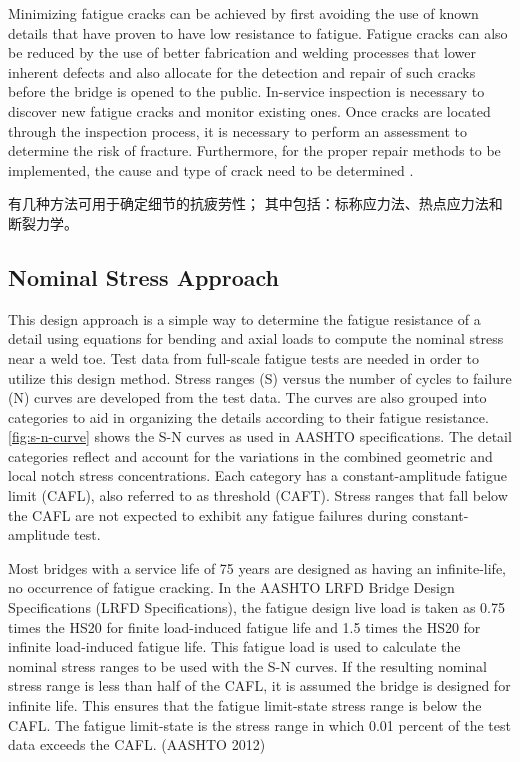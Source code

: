 Minimizing fatigue cracks can be achieved by first avoiding the use of known details that have proven to have low resistance to fatigue. Fatigue cracks can also be reduced by the use of better fabrication and welding processes that lower inherent defects and also allocate for the detection and repair of such cracks before the bridge is opened to the public. In-service inspection is necessary to discover new fatigue cracks and monitor existing ones. Once cracks are located through the inspection process, it is necessary to perform an assessment to determine the risk of fracture. Furthermore, for the proper repair methods to be implemented, the cause and type of crack need to be determined \cite{fisher1998f}.

有几种方法可用于确定细节的抗疲劳性； 其中包括：标称应力法、热点应力法和断裂力学。

\subsection{Nominal Stress Approach}
This design approach is a simple way to determine the fatigue resistance of a detail using equations for bending
and axial loads to compute the nominal stress near a weld toe. Test data from full-scale fatigue tests are needed in
order to utilize this design method. Stress ranges (S) versus the number of cycles to failure (N) curves are developed from the test data. The curves are also grouped into categories to aid in organizing the details according to their
fatigue resistance. \cref{fig:s-n-curve} shows the S-N curves as used in AASHTO specifications. The detail categories reflect
and account for the variations in the combined geometric and local notch stress concentrations. Each category has a
constant-amplitude fatigue limit (CAFL), also referred to as threshold (CAFT). Stress ranges that fall below the
CAFL are not expected to exhibit any fatigue failures during constant-amplitude test.

Most bridges with a service life of 75 years are designed as having an infinite-life, no occurrence of fatigue
cracking. In the AASHTO LRFD Bridge Design Specifications (LRFD Specifications), the fatigue design live load is
taken as 0.75 times the HS20 for finite load-induced fatigue life and 1.5 times the HS20 for infinite load-induced
fatigue life. This fatigue load is used to calculate the nominal stress ranges to be used with the S-N curves. If the
resulting nominal stress range is less than half of the CAFL, it is assumed the bridge is designed for infinite life. This
ensures that the fatigue limit-state stress range is below the CAFL. The fatigue limit-state is the stress range in which
0.01 percent of the test data exceeds the CAFL. (AASHTO 2012)

